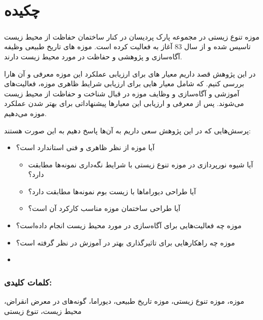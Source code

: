 
\chapter*{چکیده}

\paragraph*{}
موزه تنوع زیستی در مجموعه پارک پردیسان در کنار ساختمان حفاظت از محیط زیست تاسیس شده و از سال 83 آغاز به فعالیت کرده است.
موزه های تاریخ طبیعی وظیفه آگاه‌سازی و پژوهشی و حفاظت در مورد محیط زیست دارند.


در این پژوهش قصد داریم معیار های برای ارزیابی عملکرد این موزه معرفی و آن هارا بررسی کنیم.
که شامل معیار هایی برای ارزیابی شرایط ظاهری موزه، فعالیت‌های آموزشی و آگاه‌سازی و وظایف موزه در قبال شناخت و حفاظت از محیط زیست می‌شوند.
پس از معرفی و ارزیابی این معیارها پیشنهاداتی برای بهتر شدن عملکرد موزه می‌دهیم.

پرسش‌هایی که در این پژوهش سعی داریم به آن‌ها پاسخ دهیم به این صورت هستند:
\begin{itemize}
    \item آیا موزه از نظر ظاهری و فنی استاندارد است؟
    \begin{itemize}
        \item آیا شیوه نورپردازی در موزه تنوع زیستی با شرایط نگه‌داری نمونه‌ها مطابقت دارد؟
        \item آیا طراحی دیوراماها با زیست بوم نمونه‌ها مطابقت دارد؟
        \item آیا طراحی ساختمان موزه مناسب کارکرد آن است؟
    \end{itemize}
    \item موزه چه فعالیت‌هایی برای آگاه‌سازی در مورد محیط زیست انجام داده‌است؟
    \item موزه چه راهکارهایی برای تاثیرگذاری بهتر در آموزش در نظر گرفته است؟
    \item 
\end{itemize}

\subsection*{کلمات کلیدی:}
موزه، موزه تنوع زیستی، موزه تاریخ طبیعی، دیوراما، گونه‌های در معرض انقراض، محیط زیست، تنوع زیستی

